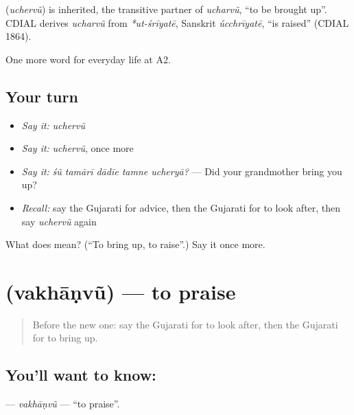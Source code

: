 \begin{cousinweb}
\textbf{} (\emph{uchervũ}) is inherited, the transitive partner of \emph{ucharvũ}, \textquotedblleft{}to be brought up\textquotedblright{}. CDIAL derives \emph{ucharvũ} from \emph{*ut-śrīyatē}, Sanskrit \emph{úcchrīyatē}, \textquotedblleft{}is raised\textquotedblright{} (CDIAL 1864).
\end{cousinweb}

\begin{grammarlens}[title={What you've built}]
One more word for everyday life at A2.
\end{grammarlens}

\subsection*{Your turn}
\begin{itemize}
\raggedright
  \item \emph{Say it:} \emph{uchervũ}
  \item \emph{Say it:} \emph{uchervũ}, once more
  \item \emph{Say it:} \emph{śũ tamārī dādīe tamne ucheryā?} — Did your grandmother bring you up?
  \item \emph{Recall:} say the Gujarati for advice, then the Gujarati for to look after, then say \emph{uchervũ} again
\end{itemize}

\begin{tcolorbox}[breakable,colback=teal!4,colframe=teal!35!black,title={Before you move on}]
What does  mean? (\textquotedblleft{}To bring up, to raise\textquotedblright{}.) Say it once more.
\end{tcolorbox}
\section[\texorpdfstring{\gu{વખાણવું} (vakhāṇvũ)}{વખાણવું (vakhāṇvũ)}]{ (vakhāṇvũ) — to praise}

\label{lesson:GU-C269-vakhanvu}



\begin{quote}
Before the new one: say the Gujarati for to look after, then the Gujarati for to bring up.
\end{quote}

\subsection*{You'll want to know: }
\textbf{} — \emph{vakhāṇvũ} — \textquotedblleft{}to praise\textquotedblright{}.

